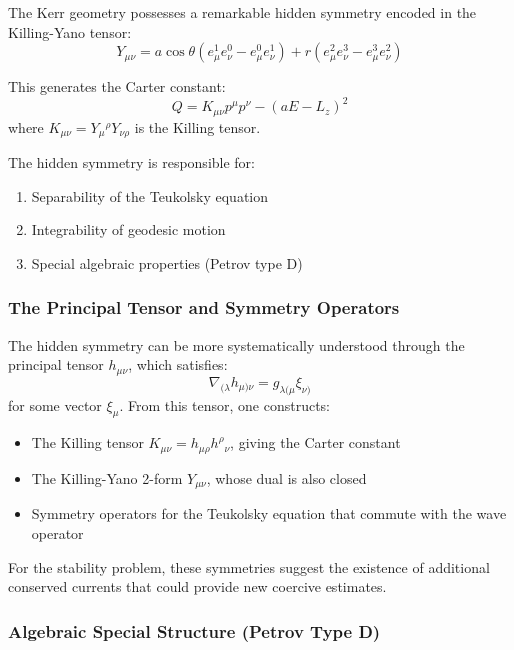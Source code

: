 \documentclass[12pt,a4paper]{article}
\begin{document}
The Kerr geometry possesses a remarkable hidden symmetry encoded in the Killing-Yano tensor:
\begin{equation}
Y_{\mu\nu} = a\cos\theta(e^1_\mu e^0_\nu - e^0_\mu e^1_\nu) + r(e^2_\mu e^3_\nu - e^3_\mu e^2_\nu)
\end{equation}

This generates the Carter constant:
\begin{equation}
Q = K_{\mu\nu}p^\mu p^\nu - (aE - L_z)^2
\end{equation}
where $K_{\mu\nu} = Y_\mu{}^\rho Y_{\nu\rho}$ is the Killing tensor.

The hidden symmetry is responsible for:
\begin{enumerate}
    \item Separability of the Teukolsky equation
    \item Integrability of geodesic motion
    \item Special algebraic properties (Petrov type D)
\end{enumerate}

\subsubsection{The Principal Tensor and Symmetry Operators}

The hidden symmetry can be more systematically understood through the principal tensor $h_{\mu\nu}$, which satisfies:
\begin{equation}
\nabla_{(\lambda}h_{\mu)\nu} = g_{\lambda(\mu}\xi_{\nu)}
\end{equation}
for some vector $\xi_\mu$. From this tensor, one constructs:
\begin{itemize}
    \item The Killing tensor $K_{\mu\nu} = h_{\mu\rho}h^\rho{}_\nu$, giving the Carter constant
    \item The Killing-Yano 2-form $Y_{\mu\nu}$, whose dual is also closed
    \item Symmetry operators for the Teukolsky equation that commute with the wave operator
\end{itemize}

For the stability problem, these symmetries suggest the existence of additional conserved currents that could provide new coercive estimates.

\subsubsection{Algebraic Special Structure (Petrov Type D)}
\end{document}
